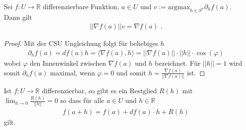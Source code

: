 \begin{Satz}
Sei   $f: U \to \mathbb{R}$ differenzierbare Funktion,  $a \in U$ und $v := \text{argmax}_{ h \in S^n} \partial_h f(a) $.
Dann gilt 
\begin{align*}
|| \nabla f(a) || v =  \nabla f(a) \; .
\end{align*} 
\end{Satz}
\begin{proof}
Mit der CSU Ungleichung folgt für beliebiges $h$ 
\begin{align*}
\partial_h f(a) = df(a) h = \langle \nabla f(a) , h \rangle = || \nabla f(a)||  \cdot ||h|| \cdot \cos(\varphi) 
\end{align*} 
wobei $\varphi$ den Innenwinkel zwischen $\nabla f(a)$ und $h$ bezeichnet. Für $||h|| = 1$ wird somit $\partial_h f(a) $ maximal, wenn $\varphi = 0$ und somit $h =  \frac{\nabla f(a)}{||\nabla f(a)||}$ ist.
\end{proof}







\begin{Satz}
\label{lokaleLinearisierung}
Ist  $f: U \to \mathbb{R}$ differenzierbar, so gibt es ein Restglied $R(h)$ mit  $\lim_{h \to 0} \frac{R(h)}{ ||h||} = 0$  so dass für alle $a \in U$ und $h \in \mathbb{R}$ 
\begin{align*}
f(a + h)  =  f(a)  +  df(a) \cdot h + R(h) 
\end{align*}
gilt. 
\end{Satz}




